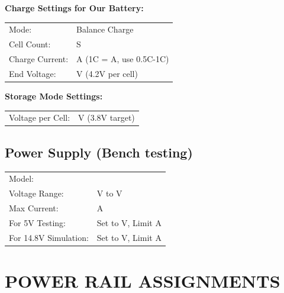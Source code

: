 \documentclass[10pt,letterpaper]{article}
\begin{document}
\textbf{Charge Settings for Our Battery:}
\begin{tabularx}{\textwidth}{lX}
Mode: & Balance Charge \\
Cell Count: & \underline{\hspace{3cm}} S \\
Charge Current: & \underline{\hspace{2cm}} A (1C = \underline{\hspace{1cm}} A, use 0.5C-1C) \\
End Voltage: & \underline{\hspace{3cm}} V (4.2V per cell) \\
\end{tabularx}

\textbf{Storage Mode Settings:}
\begin{tabularx}{\textwidth}{lX}
Voltage per Cell: & \underline{\hspace{3cm}} V (3.8V target) \\
\end{tabularx}

\subsection*{Power Supply (Bench testing)}
\begin{tabularx}{\textwidth}{lX}
Model: & \underline{\hspace{8cm}} \\
Voltage Range: & \underline{\hspace{2cm}} V to \underline{\hspace{2cm}} V \\
Max Current: & \underline{\hspace{3cm}} A \\[0.5em]
For 5V Testing: & Set to \underline{\hspace{2cm}} V, Limit \underline{\hspace{2cm}} A \\
For 14.8V Simulation: & Set to \underline{\hspace{2cm}} V, Limit \underline{\hspace{2cm}} A \\
\end{tabularx}

\newpage

\section*{POWER RAIL ASSIGNMENTS}
\end{document}
